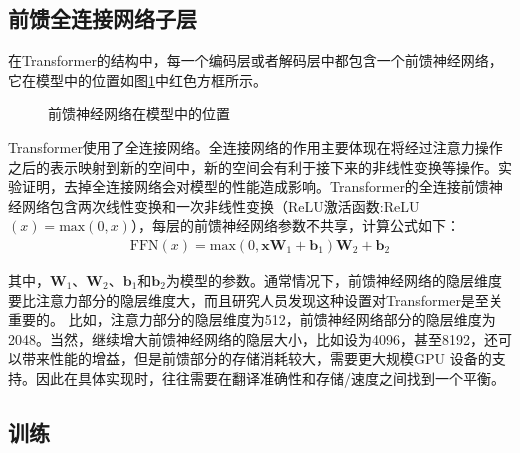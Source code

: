 
\subsection{前馈全连接网络子层}

\parinterval 在Transformer的结构中，每一个编码层或者解码层中都包含一个前馈神经网络，它在模型中的位置如图\ref{fig:6-52}中红色方框所示。

\begin{figure}[htp]
\centering

\caption{前馈神经网络在模型中的位置}
\label{fig:6-52}
\end{figure}

\parinterval Transformer使用了全连接网络。全连接网络的作用主要体现在将经过注意力操作之后的表示映射到新的空间中，新的空间会有利于接下来的非线性变换等操作。实验证明，去掉全连接网络会对模型的性能造成影响。Transformer的全连接前馈神经网络包含两次线性变换和一次非线性变换（ReLU激活函数:ReLU$(x)=\textrm{max}⁡(0,x)$），每层的前馈神经网络参数不共享，计算公式如下：
\begin{eqnarray}
\textrm{FFN}(x) = \textrm{max} (0,\mathbf{x}\mathbf{W}_1 + \mathbf{b}_1)\mathbf{W}_2 + \mathbf{b}_2
\label{eq:6-52}
\end{eqnarray}

\noindent 其中，$\mathbf{W}_1$、$\mathbf{W}_2$、$\mathbf{b}_1$和$\mathbf{b}_2$为模型的参数。通常情况下，前馈神经网络的隐层维度要比注意力部分的隐层维度大，而且研究人员发现这种设置对Transformer是至关重要的。 比如，注意力部分的隐层维度为512，前馈神经网络部分的隐层维度为2048。当然，继续增大前馈神经网络的隐层大小，比如设为4096，甚至8192，还可以带来性能的增益，但是前馈部分的存储消耗较大，需要更大规模GPU 设备的支持。因此在具体实现时，往往需要在翻译准确性和存储/速度之间找到一个平衡。


\subsection{训练}

